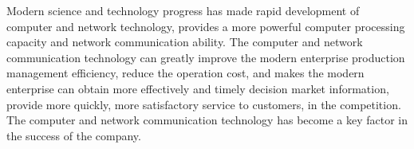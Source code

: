 

Modern science and technology progress has made rapid development of computer and network technology, provides a more powerful computer processing capacity and network communication ability. The computer and network communication technology can greatly improve the modern enterprise production management efficiency, reduce the operation cost, and makes the modern enterprise can obtain more effectively and timely decision market information, provide more quickly, more satisfactory service to customers, in the competition. The computer and network communication technology has become a key factor in the success of the company.
